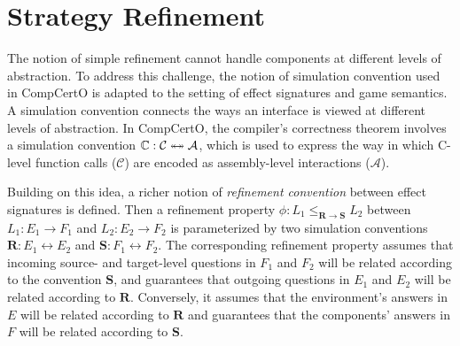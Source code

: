 \chapter{Strategy Refinement}
\label{ch:rc}

The notion of simple refinement cannot handle
components at different levels of abstraction.
To address this challenge,
the notion of simulation convention used in CompCertO
is adapted to the setting of effect signatures and game semantics.
A simulation convention connects
the ways an interface is viewed at different levels of abstraction.
In CompCertO,
the compiler's correctness theorem involves
a simulation convention
$\mathbb{C} : \mathcal{C} \twoheadleftarrow \mathrel{\mkern-15mu} \twoheadrightarrow \mathcal{A}$,
which is used to express the way in which
C-level function calls ($\mathcal{C}$) are encoded
as assembly-level interactions ($\mathcal{A}$).

Building on this idea,
a richer notion of \emph{refinement convention} between effect signatures is defined.
Then a refinement property
$\phi : L_1 \le_{\mathbf{R} \rightarrow \mathbf{S}} L_2$
between
$L_1 : E_1 \rightarrow F_1$ and
$L_2 : E_2 \rightarrow F_2$
is parameterized by two simulation conventions
$\mathbf{R} : E_1 \leftrightarrow E_2$ and
$\mathbf{S} : F_1 \leftrightarrow F_2$.
The corresponding refinement property assumes that incoming
source- and target-level questions in $F_1$ and $F_2$
will be related according to the convention $\mathbf{S}$,
and guarantees that outgoing questions in $E_1$ and $E_2$
will be related according to $\mathbf{R}$.
Conversely, it assumes that
the environment's answers in $E$
will be related according to $\mathbf{R}$
and guarantees that the components' answers in $F$
will be related according to $\mathbf{S}$.



